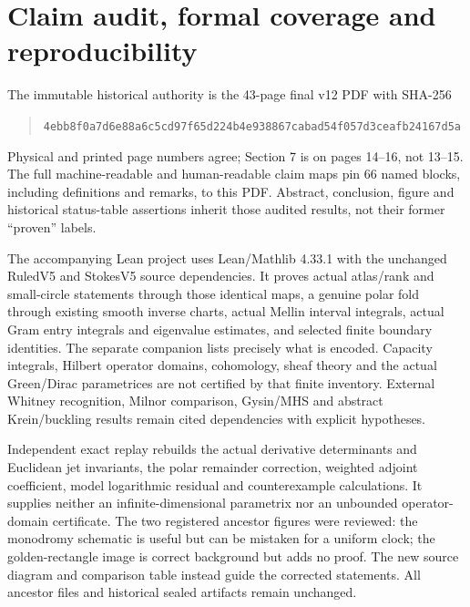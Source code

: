 \documentclass[11pt]{article}
\theoremstyle{readable}
\theoremstyle{remark}\newtheorem{remark}[theorem]{Remark}
\begin{document}
\section{Claim audit, formal coverage and reproducibility}
The immutable historical authority is the 43-page final v12 PDF with SHA-256
\begin{quote}\small
\nolinkurl{4ebb8f0a7d6e88a6c5cd97f65d224b4e938867cabad54f057d3ceafb24167d5a}
\end{quote}
Physical and printed page numbers agree; Section 7 is on pages 14--16,
not 13--15. The full machine-readable and human-readable claim maps pin
66 named blocks, including definitions and remarks, to this PDF. Abstract,
conclusion, figure and historical status-table assertions inherit those
audited results, not their former ``proven'' labels.

The accompanying Lean project uses Lean/Mathlib 4.33.1 with the unchanged
RuledV5 and StokesV5 source dependencies. It proves actual atlas/rank and
small-circle statements through those identical maps, a genuine polar fold
through existing smooth inverse charts, actual Mellin interval integrals,
actual Gram entry integrals and eigenvalue estimates, and selected finite
boundary identities. The separate companion lists precisely what is encoded.
Capacity integrals, Hilbert operator domains, cohomology, sheaf theory and
the actual Green/Dirac parametrices are not certified by that finite inventory.
External Whitney recognition, Milnor comparison, Gysin/MHS and abstract
Krein/buckling results remain cited dependencies with explicit hypotheses.

Independent exact replay rebuilds the actual derivative determinants and
Euclidean jet invariants, the polar remainder correction, weighted adjoint
coefficient, model logarithmic residual and counterexample calculations.
It supplies neither an infinite-dimensional parametrix nor an unbounded
operator-domain certificate. The two registered ancestor figures were reviewed:
the monodromy schematic is useful but can be mistaken for a uniform clock;
the golden-rectangle image is correct background but adds no proof. The new
source diagram and comparison table instead guide the corrected statements.
All ancestor files and historical sealed artifacts remain unchanged.
\end{document}
